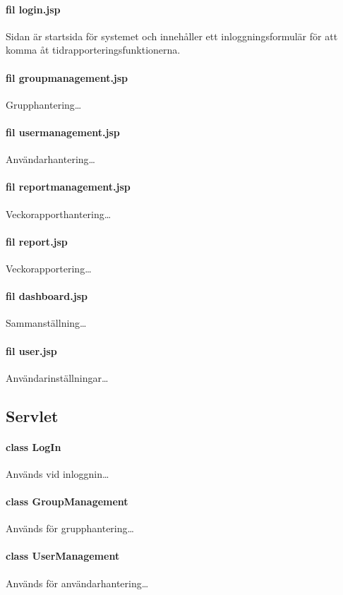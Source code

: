 \documentclass[paper=a4, fontsize=11pt,twoside]{article}
\begin{document}

\paragraph{fil login.jsp}Sidan är startsida för systemet och innehåller ett inloggningsformulär för att komma åt tidrapporteringsfunktionerna.
\paragraph{fil groupmanagement.jsp}Grupphantering… %
\paragraph{fil usermanagement.jsp}Användarhantering… %
\paragraph{fil reportmanagement.jsp}Veckorapporthantering… %
\paragraph{fil report.jsp}Veckorapportering… %
\paragraph{fil dashboard.jsp}Sammanställning… %
\paragraph{fil user.jsp}Användarinställningar… %

\subsection{Servlet}
\paragraph{class LogIn} Används vid inloggnin… %
\paragraph{class GroupManagement} Används för grupphantering… %
\paragraph{class UserManagement} Används för användarhantering… %
\end{document}

